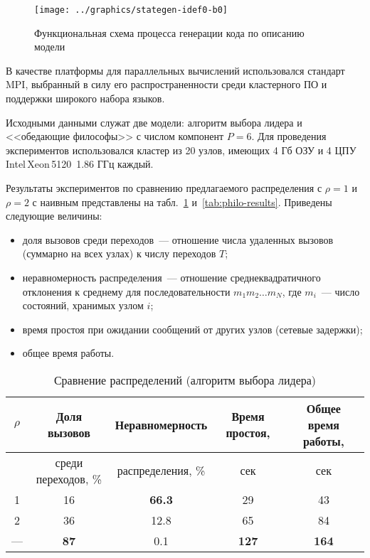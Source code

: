 \documentclass[12pt,a4paper,fleqn]{article}
\begin{document}
\begin{figure}[ht]
  \centering
  \texttt{[image: ../graphics/stategen-idef0-b0]}
  \caption{Функциональная схема процесса генерации кода по описанию модели}
  \label{fig:stategen-idef0-b0}
\end{figure}

В качестве платформы для параллельных вычислений использовался стандарт MPI, выбранный в силу его распространенности
среди кластерного ПО и поддержки широкого набора языков.

Исходными данными служат две модели: алгоритм выбора лидера и <<обедающие философы>> с числом компонент $P = 6$. Для
проведения экспериментов использовался кластер из 20 узлов, имеющих 4 Гб ОЗУ и 4 ЦПУ Intel\,Xeon\,5120~1.86 ГГц каждый.

Результаты экспериментов по сравнению предлагаемого распределения с $\rho = 1$ и $\rho = 2$ с наивным представлены на
табл.~\ref{tab:election-results} и~\ref{tab:philo-results}. Приведены следующие величины:

\begin{itemize}
\item доля вызовов среди переходов~--- отношение числа удаленных вызовов (суммарно на всех узлах) к числу переходов $T$;

\item неравномерность распределения~--- отношение среднеквадратичного отклонения к среднему для последовательности $m_1
  m_2 \ldots m_N$, где $m_i$~--- число состояний, хранимых узлом $i$;

\item время простоя при ожидании сообщений от других узлов (сетевые задержки);

\item общее время работы.
\end{itemize}

\begin{table}[htb]
  \centering
  \begin{tabular}{|c|c|c|c|c|}
    \hline
    $\rho$ & Доля вызовов        & Неравномерность   & Время простоя, & Общее время работы, \\ \hline
           & среди переходов, \% & распределения, \% & сек            & сек                 \\ \hline
    1      & 16                  & \textbf{66.3}     & 29             & 43                  \\ \hline
    2      & 36                  & 12.8              & 65             & 84                  \\ \hline
    ---    & \textbf{87}         & 0.1               & \textbf{127}   & \textbf{164}        \\ \hline
  \end{tabular}
  \caption{Сравнение распределений (алгоритм выбора лидера)}
  \label{tab:election-results}
\end{table}
\end{document}
